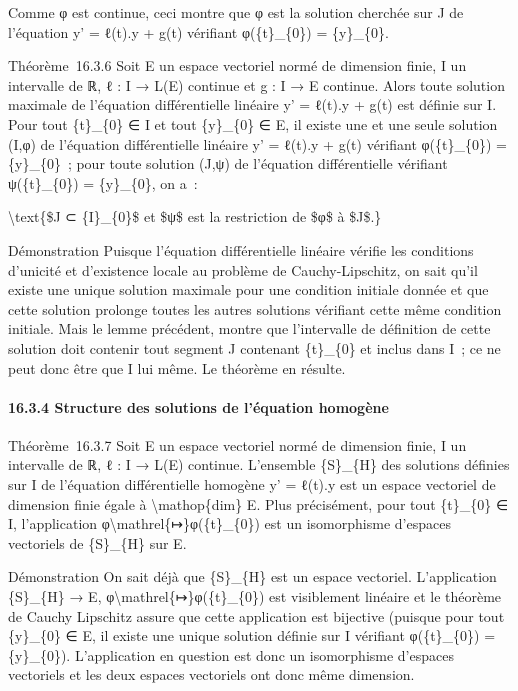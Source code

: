 \documentclass[]{article}
\begin{document}
Comme φ est continue, ceci montre que φ est la solution cherchée sur J
de l'équation y' = ℓ(t).y + g(t) vérifiant φ(\{t\}\_\{0\}) =
\{y\}\_\{0\}.

Théorème~16.3.6 Soit E un espace vectoriel normé de dimension finie, I
un intervalle de ℝ, ℓ : I → L(E) continue et g : I → E continue. Alors
toute solution maximale de l'équation différentielle linéaire y' =
ℓ(t).y + g(t) est définie sur I. Pour tout \{t\}\_\{0\} ∈ I et tout
\{y\}\_\{0\} ∈ E, il existe une et une seule solution (I,φ) de
l'équation différentielle linéaire y' = ℓ(t).y + g(t) vérifiant
φ(\{t\}\_\{0\}) = \{y\}\_\{0\}~; pour toute solution (J,ψ) de l'équation
différentielle vérifiant ψ(\{t\}\_\{0\}) = \{y\}\_\{0\}, on a~:

\textbackslash{}text\{\$J ⊂ \{I\}\_\{0\}\$ et \$ψ\$ est la restriction
de \$φ\$ à \$J\$.\}

Démonstration Puisque l'équation différentielle linéaire vérifie les
conditions d'unicité et d'existence locale au problème de
Cauchy-Lipschitz, on sait qu'il existe une unique solution maximale pour
une condition initiale donnée et que cette solution prolonge toutes les
autres solutions vérifiant cette même condition initiale. Mais le lemme
précédent, montre que l'intervalle de définition de cette solution doit
contenir tout segment J contenant \{t\}\_\{0\} et inclus dans I~; ce ne
peut donc être que I lui même. Le théorème en résulte.

\paragraph{16.3.4 Structure des solutions de l'équation homogène}

Théorème~16.3.7 Soit E un espace vectoriel normé de dimension finie, I
un intervalle de ℝ, ℓ : I → L(E) continue. L'ensemble \{S\}\_\{H\} des
solutions définies sur I de l'équation différentielle homogène y' =
ℓ(t).y est un espace vectoriel de dimension finie égale à
\textbackslash{}mathop\{dim\} E. Plus précisément, pour tout
\{t\}\_\{0\} ∈ I, l'application
φ\textbackslash{}mathrel\{↦\}φ(\{t\}\_\{0\}) est un isomorphisme
d'espaces vectoriels de \{S\}\_\{H\} sur E.

Démonstration On sait déjà que \{S\}\_\{H\} est un espace vectoriel.
L'application \{S\}\_\{H\} → E,
φ\textbackslash{}mathrel\{↦\}φ(\{t\}\_\{0\}) est visiblement linéaire et
le théorème de Cauchy Lipschitz assure que cette application est
bijective (puisque pour tout \{y\}\_\{0\} ∈ E, il existe une unique
solution définie sur I vérifiant φ(\{t\}\_\{0\}) = \{y\}\_\{0\}).
L'application en question est donc un isomorphisme d'espaces vectoriels
et les deux espaces vectoriels ont donc même dimension.
\end{document}
